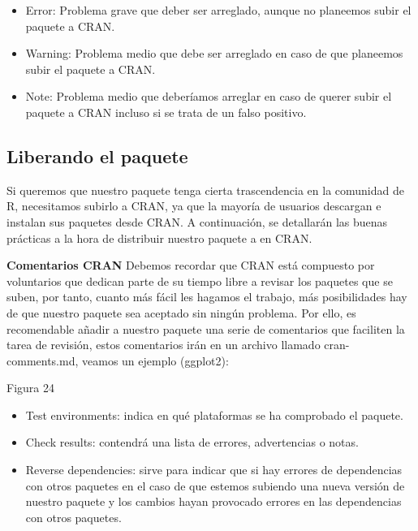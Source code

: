 \begin{itemize}
    \item Error: Problema grave que deber ser arreglado, aunque no planeemos subir el
paquete a CRAN.
    \item Warning: Problema medio que debe ser arreglado en caso de que planeemos subir
el paquete a CRAN.
    \item Note: Problema medio que deber\'iamos arreglar en caso de querer subir el paquete a
CRAN incluso si se trata de un falso positivo.
\end{itemize}


\subsection{Liberando el paquete}

Si queremos que nuestro paquete tenga cierta trascendencia en la comunidad de R,
necesitamos subirlo a CRAN, ya que la mayor\'ia de usuarios descargan e instalan sus
paquetes desde CRAN.
A continuaci\'on, se detallar\'an las buenas pr\'acticas a la hora de distribuir nuestro paquete a
en CRAN.


\textbf{Comentarios CRAN}
Debemos recordar que CRAN est\'a compuesto por voluntarios que dedican parte de su tiempo
libre a revisar los paquetes que se suben, por tanto, cuanto m\'as f\'acil les hagamos el trabajo,
m\'as posibilidades hay de que nuestro paquete sea aceptado sin ning\'un problema.
Por ello, es recomendable a\~nadir a nuestro paquete una serie de comentarios que faciliten la
tarea de revisi\'on, estos comentarios ir\'an en un archivo llamado cran-comments.md, veamos
un ejemplo (ggplot2):

Figura 24

\begin{itemize}

    \item Test environments: indica en qu\'e plataformas se ha comprobado el paquete.
    \item Check results: contendr\'a una lista de errores, advertencias o notas.
    \item Reverse dependencies: sirve para indicar que si hay errores de dependencias con
otros paquetes en el caso de que estemos subiendo una nueva versi\'on de nuestro
paquete y los cambios hayan provocado errores en las dependencias con otros
paquetes.
\end{itemize}

